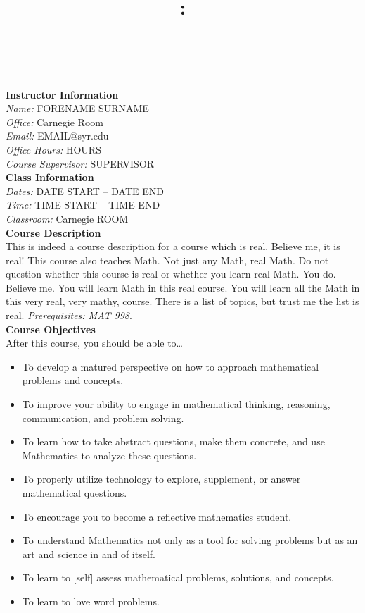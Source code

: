 \documentclass[11pt,letterpaper]{article}
\title{\Large\bfseries \coursecode: \coursetitle \\[0.1cm] \coursesection\ --- \semester}
\author{}
\date{}
\makeatletter
\newcommand{\lefthead}[2]{\noindent\textbf{#1}\hfill\\[#2]}
\newcommand{\instructor}{FORENAME SURNAME}
\newcommand{\office}{Carnegie Room}
\newcommand{\email}{EMAIL@syr.edu}
\newcommand{\officehours}{HOURS}
\newcommand{\coursesupervisor}{SUPERVISOR}
\newcommand{\classdates}{DATE START -- DATE END}
\newcommand{\classtime}{TIME START -- TIME END}
\newcommand{\classroom}{Carnegie ROOM}
\makeatother
\begin{document}
\maketitle
\thispagestyle{empty}
\vspace{-2cm}


\lefthead{Instructor Information}{0.3cm}
\indent \emph{Name:} \instructor \\
\indent \emph{Office:} \office \\
\indent \emph{Email:} \email \\
\indent \emph{Office Hours:} \officehours \\
\indent \emph{Course Supervisor:} \coursesupervisor \\[0.3cm]


\lefthead{Class Information}{0.3cm}
\indent \emph{Dates:} \classdates \\
\indent \emph{Time:} \classtime \\
\indent \emph{Classroom:} \classroom \\[0.3cm]





\lefthead{Course Description}{0.3cm}
\noindent This is indeed a course description for a course which is real. Believe me, it is real! This course also teaches Math. Not just any Math, real Math. Do not question whether this course is real or whether you learn real Math. You do. Believe me. You will learn Math in this real course. You will learn all the Math in this very real, very mathy, course. There is a list of topics, but trust me the list is real.  \emph{Prerequisites: MAT 998}. \\[0.3cm]





\lefthead{Course Objectives}{0.3cm}
After this course, you should be able to\dots
        \begin{itemize}
        \item To develop a matured perspective on how to approach mathematical problems and concepts. 
        \item To improve your ability to engage in mathematical thinking, reasoning, communication, and
        problem solving.
        \item To learn how to take abstract questions, make them concrete, and use Mathematics to analyze these questions.
        \item To properly utilize technology to explore, supplement, or answer mathematical questions.
        \item To encourage you to become a reflective mathematics student.
        \item To understand Mathematics not only as a tool for solving problems but as an art and science in and of itself. 
        \item To learn to [self] assess mathematical problems, solutions, and concepts. 
        \item To learn to love word problems.
        \end{itemize} \vspace{0.3cm}
\end{document}
